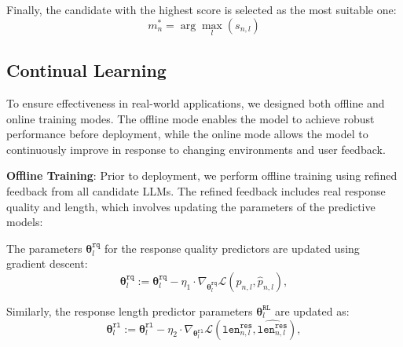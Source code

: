 Finally, the candidate with the highest score is selected as the most suitable one:
\begin{equation}
    m_n^* = \arg\max_{l} (s_{n,l})
\end{equation}



\subsection{Continual Learning}
To ensure effectiveness in real-world applications, we designed both offline and online training modes. The offline mode enables the model to achieve robust performance before deployment, while the online mode allows the model to continuously improve in response to changing environments and user feedback.

\textbf{Offline Training}: 
Prior to deployment, we perform offline training using refined feedback from all candidate LLMs.  
The refined feedback includes real response quality and length, which involves updating the parameters of the predictive models:

The parameters \( \boldsymbol{\theta}_l^\texttt{rq} \) for the response quality predictors are updated using gradient descent:
\begin{equation}
    \boldsymbol{\theta}_l^\texttt{rq} := \boldsymbol{\theta}_l^\texttt{rq} - \eta_1 \cdot \nabla_{\boldsymbol{\theta}_l^\texttt{rq}} \mathcal{L}(p_{n,l}, \hat{p}_{n,l}),
    \label{rqupdate}
\end{equation}

Similarly, the response length predictor parameters \( \boldsymbol{\theta}_l^\texttt{RL} \) are updated as:
\begin{equation}
    \boldsymbol{\theta}_l^\texttt{rl} := \boldsymbol{\theta}_l^\texttt{rl} - \eta_2 \cdot \nabla_{\boldsymbol{\theta}_l^\texttt{rl}} \mathcal{L}(\texttt{len}_{n,l}^{\texttt{res}}, \hat{\texttt{len}_{n,l}^{\texttt{res}}}),
    \label{rlupdate}
\end{equation}


